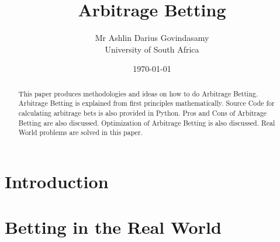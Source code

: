 \documentclass{report}
\title{Arbitrage Betting}
\author{Mr Ashlin Darius Govindasamy\\ \large{University of South Africa}}
\date{\today}
\begin{document}
\maketitle
\newpage
\begin{abstract}
    This paper produces methodologies and ideas on how to do Arbitrage Betting. Arbitrage Betting is explained from first principles mathematically. Source Code for calculating arbitrage bets is also provided in Python. Pros and Cons of Arbitrage Betting are also discussed. Optimization of Arbitrage Betting is also discussed. Real World problems are solved in this paper.
\end{abstract}

\tableofcontents



\chapter{Introduction}


\chapter{Betting in the Real World}


\newpage
\end{document}
